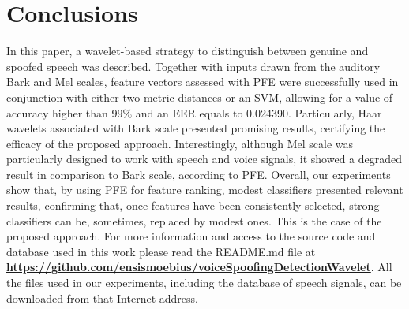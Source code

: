 \section{Conclusions}
\label{sec:conclusions}
\par In this paper, a wavelet-based strategy to distinguish between genuine and spoofed speech was described. Together with inputs drawn  from the auditory Bark and Mel scales, feature vectors assessed with PFE were successfully used in conjunction with either two metric distances or an SVM, allowing for a value of accuracy higher than $99\%$ and an EER equals to 0.024390. Particularly, Haar wavelets associated with Bark scale presented promising results, certifying the efficacy of the proposed approach. Interestingly, although Mel scale was particularly designed to work with speech and voice signals, it showed a degraded result in comparison to Bark scale, according to PFE. Overall, our experiments show that, by using PFE for feature ranking, modest classifiers presented relevant results, confirming that, once features have been consistently selected, strong classifiers can be, sometimes, replaced by modest ones. This is the case of the proposed approach. For more information and access to the source code and database used in this work please read the README.md file at \href{https://github.com/ensismoebius/voiceSpoofingDetectionWavelet}{\textbf{https://github.com/ensismoebius/voiceSpoofingDetectionWavelet}}. All the files used in our experiments, including the database of speech signals, can be downloaded from that Internet address. 
